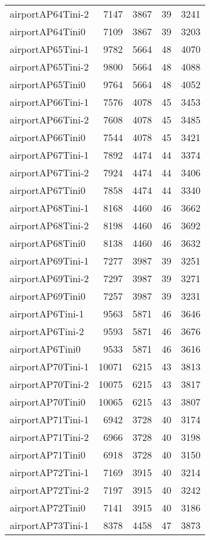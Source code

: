 \begin{longtable}{lrrrr}
airportAP64Tini-2 & 7147 & 3867 & 39 & 3241 \\
airportAP64Tini0 & 7109 & 3867 & 39 & 3203 \\
airportAP65Tini-1 & 9782 & 5664 & 48 & 4070 \\
airportAP65Tini-2 & 9800 & 5664 & 48 & 4088 \\
airportAP65Tini0 & 9764 & 5664 & 48 & 4052 \\
airportAP66Tini-1 & 7576 & 4078 & 45 & 3453 \\
airportAP66Tini-2 & 7608 & 4078 & 45 & 3485 \\
airportAP66Tini0 & 7544 & 4078 & 45 & 3421 \\
airportAP67Tini-1 & 7892 & 4474 & 44 & 3374 \\
airportAP67Tini-2 & 7924 & 4474 & 44 & 3406 \\
airportAP67Tini0 & 7858 & 4474 & 44 & 3340 \\
airportAP68Tini-1 & 8168 & 4460 & 46 & 3662 \\
airportAP68Tini-2 & 8198 & 4460 & 46 & 3692 \\
airportAP68Tini0 & 8138 & 4460 & 46 & 3632 \\
airportAP69Tini-1 & 7277 & 3987 & 39 & 3251 \\
airportAP69Tini-2 & 7297 & 3987 & 39 & 3271 \\
airportAP69Tini0 & 7257 & 3987 & 39 & 3231 \\
airportAP6Tini-1 & 9563 & 5871 & 46 & 3646 \\
airportAP6Tini-2 & 9593 & 5871 & 46 & 3676 \\
airportAP6Tini0 & 9533 & 5871 & 46 & 3616 \\
airportAP70Tini-1 & 10071 & 6215 & 43 & 3813 \\
airportAP70Tini-2 & 10075 & 6215 & 43 & 3817 \\
airportAP70Tini0 & 10065 & 6215 & 43 & 3807 \\
airportAP71Tini-1 & 6942 & 3728 & 40 & 3174 \\
airportAP71Tini-2 & 6966 & 3728 & 40 & 3198 \\
airportAP71Tini0 & 6918 & 3728 & 40 & 3150 \\
airportAP72Tini-1 & 7169 & 3915 & 40 & 3214 \\
airportAP72Tini-2 & 7197 & 3915 & 40 & 3242 \\
airportAP72Tini0 & 7141 & 3915 & 40 & 3186 \\
airportAP73Tini-1 & 8378 & 4458 & 47 & 3873 \\

\end{longtable}
